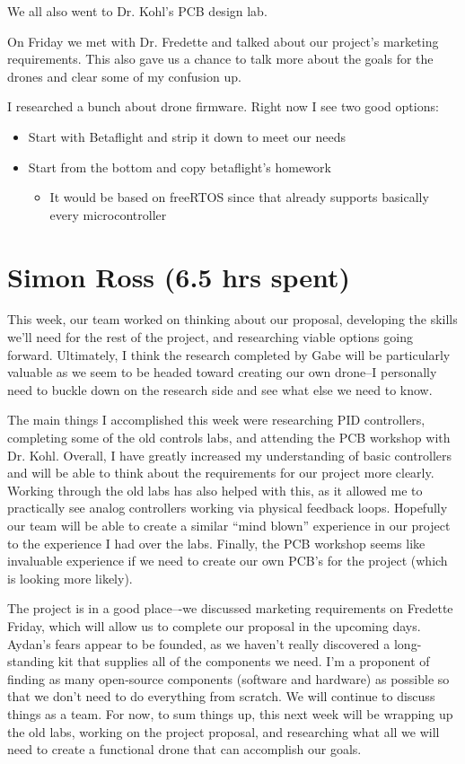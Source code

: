 \documentclass[12pt, titlepage]{article}
\begin{document}
We all also went to Dr. Kohl’s PCB design lab. 

On Friday we met with Dr. Fredette and talked about our project’s marketing requirements. This also gave us a chance to talk more about the goals for the drones and clear some of my confusion up. 

I researched a bunch about drone firmware. Right now I see two good options:
\begin{itemize}
	\item Start with Betaflight and strip it down to meet our needs 
	\item Start from the bottom and copy betaflight’s homework
    \begin{itemize}
		\item It would be based on freeRTOS since that already supports basically every microcontroller
	\end{itemize}
\end{itemize}

\section*{Simon Ross (6.5 hrs spent)}

This week, our team worked on thinking about our proposal, developing the skills we’ll need for the rest of the project, and researching viable options going forward. Ultimately, I think the research completed by Gabe will be particularly valuable as we seem to be headed toward creating our own drone--I personally need to buckle down on the research side and see what else we need to know.

The main things I accomplished this week were researching PID controllers, completing some of the old controls labs, and attending the PCB workshop with Dr. Kohl. Overall, I have greatly increased my understanding of basic controllers and will be able to think about the requirements for our project more clearly. Working through the old labs has also helped with this, as it allowed me to practically see analog controllers working via physical feedback loops. Hopefully our team will be able to create a similar “mind blown” experience in our project to the experience I had over the labs. Finally, the PCB workshop seems like invaluable experience if we need to create our own PCB’s for the project (which is looking more likely). 

The project is in a good place–-we discussed marketing requirements on Fredette Friday, which will allow us to complete our proposal in the upcoming days. Aydan’s fears appear to be founded, as we haven’t really discovered a long-standing kit that supplies all of the components we need. I’m a proponent of finding as many open-source components (software and hardware) as possible so that we don’t need to do everything from scratch. We will continue to discuss things as a team. For now, to sum things up, this next week will be wrapping up the old labs, working on the project proposal, and researching what all we will need to create a functional drone that can accomplish our goals. 
\end{document}
